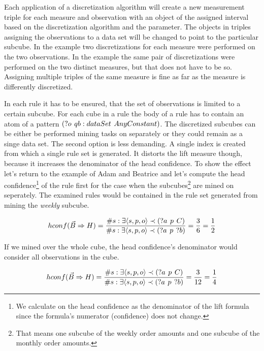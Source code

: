 Each application of a discretization algorithm will create a new measurement triple for each measure and observation with an object of the assigned interval based on the discretization algorithm and the parameter. The objects in triples assigning the observations to a data set will be changed to point to the particular subcube. In the example two discretizations for each measure were performed on the two observations. In the example the same pair of discretizations were performed on the two distinct measures, but that does not have to be so. Assigning multiple triples of the same measure is fine as far as the measure is differently discretized.

In each rule it has to be ensured, that the set of observations is limited to a certain subcube. For each cube in a rule the body of a rule has to contain an atom of a pattern $(?o\hspace{0.4em}qb:dataSet\hspace{0.4em}AnyConstant)$. The discretized subcubes can be either be performed mining tasks on separately or they could remain as a singe data set. The second option is less demanding. A single index is created from which a single rule set is generated. It distorts the lift measure though, because it increases the denominator of the head confidence. To show the effect let's return to the example of Adam and Beatrice and let's compute the head confidence\footnote{We calculate on the head confidence as the denominator of the lift formula since the formula's numerator (confidence) does not change.} of the rule first for the case when the subcubes\footnote{That means one subcube of the weekly order amounts and one subcube of the monthly order amounts.} are mined on seperately. The examined rules would be contained in the rule set generated from mining the \textit{weekly} subcube.

$$hconf(\vec{B} \Rightarrow H) = \frac{\# s: \exists \langle s,p,o\rangle \prec (?a\hspace{0.4em}p\hspace{0.4em}C) }{\# s: \exists \langle s,p,o\rangle \prec (?a\hspace{0.4em}p\hspace{0.4em}?b)} = \frac{3}{6} = \frac{1}{2}$$

If we mined over the whole cube, the head confidence's denominator would consider all observations in the cube.

$$hconf(\vec{B} \Rightarrow H) = \frac{\# s: \exists \langle s,p,o\rangle \prec (?a\hspace{0.4em}p\hspace{0.4em}C) }{\# s: \exists \langle s,p,o\rangle \prec (?a\hspace{0.4em}p\hspace{0.4em}?b)} = \frac{3}{12} = \frac{1}{4}$$

